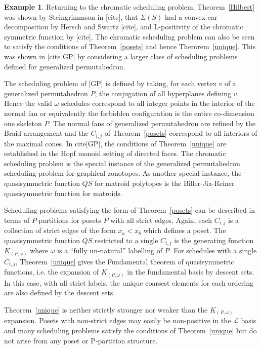 \documentclass[12pt,reqno]{amsart}
\numberwithin{definition}{section}
\theoremstyle{definition}
\newtheorem{example}[definition]{Example}
\newcommand{\ncL}{\mathcal{L}}
\begin{document}
\begin{example}
Returning to the chromatic scheduling problem, Theorem~\ref{Hilbert}
was shown by Steingrimmson in [cite], that $\Sigma(S)$ had a convex
ear decomposition by Hersch and Swartz [cite], and L-positivity of the
chromatic symmetric function by [cite].  The chromatic scheduling
problem can also be seen to satisfy the conditions of
Theorem~\ref{posets} and hence Therorem~\ref{unique}.  This was shown
in [cite GP] by considering a larger class of scheduling problems
defined for generalized permutahedron.  

The scheduling problem of [GP] is defined by taking, for each vertex
$v$ of a generalized permutahedron $P$, the conjugation of all
hyperplanes defining $v$.  Hence the valid $\omega$ schedules
correspond to all integer points in the interior of the normal fan or
equivalently the forbidden configuration is the entire co-dimension
one skeleton $P$.  The normal fans of generalized permutahedron are
refined by the Braid arrangement and the $C_{i,j}$ of
Theorem~\ref{posets} correspond to all interiors of the maximal cones.
In cite[GP], the conditions of Theorem~\ref{unique} are established in
the Hopf monoid setting of directed faces.  The chromatic scheduling
problem is the special instance of the generalized permutahedron
scheduling problem for graphical zonotopes.  As another special
instance, the quasisymmetric function $QS$ for matroid polytopes is
the Biller-Jia-Reiner quasisymmetric function for matroids.
\end{example}


Scheduling problems satisfying the form of Theorem~\ref{posets} can be
described in terms of $P$-partitions for posets $P$ with all strict
edges.  Again, each $C_{i,j}$ is a collection of strict edges of the
form $x_a < x_b$ which defines a poset.  The quasisymmetric function
$QS$ restricted to a single $C_{i,j}$ is the generating function
$K_{(P,\omega)}$ where $\omega$ is a ``fully un-natural'' labelling of
$P$.  For schedules with a single $C_{i,j}$, Theorem~\ref{unique}
gives the Fundamental theorem of quasisymmetric functions, i.e. the
expansion of $K_{(P,\omega)}$ in the fundamental basis by descent
sets.  In this case, with all strict labels, the unique coarsest
elements for each ordering are also defined by the descent sets.


Theorem~\ref{unique} is neither strictly stronger nor weaker than the
$K_{(P,\omega)}$ expansion.  Posets with non-strict edges may easily
be non-positive in the $\ncL$ basis and many scheduling problems
satisfy the conditions of Theorem~\ref{unique} but do not arise from
any poset or P-partition structure.
\end{document}
